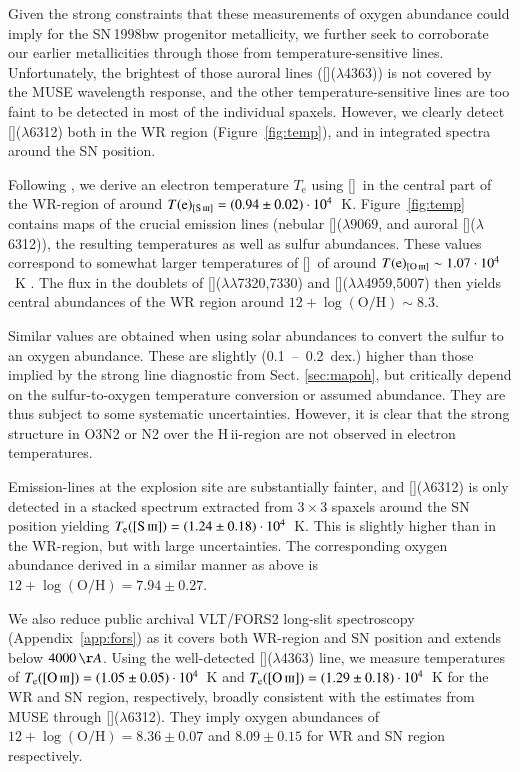 \documentclass[traditabstract]{aa}
\newcommand{\hii}{\mbox{H\,{\sc ii}}}
\newcommand{\oh}{12+\log(\mathrm{O/H})}
\newcommand{\siii}{[\ion{S}{iii}]}
\newcommand{\oii}{[\ion{O}{ii}]}
\newcommand{\oiii}{[\ion{O}{iii}]}
\begin{document}
Given the strong constraints that these measurements of oxygen abundance could imply for the SN\,1998bw progenitor metallicity, we further seek to corroborate our earlier metallicities through those from temperature-sensitive lines. Unfortunately, the brightest of those auroral lines (\oiii($\lambda$4363)) is not covered by the MUSE wavelength response, and the other temperature-sensitive lines are too faint to be detected in most of the individual spaxels. However, we clearly detect \siii($\lambda$6312) both in the WR region (Figure~\ref{fig:temp}), and in integrated spectra around the SN position.



Following \citet{2013ApJS..207...21N}, we derive an electron temperature $T_{\mathrm{e}}$ using \siii\, in the central part of the WR-region of around $T(\mathrm{e})_{\siii}=(0.94\pm0.02)\cdot10^{4}$~K. Figure~\ref{fig:temp} contains maps of the crucial emission lines (nebular \siii($\lambda9069$, and auroral \siii($\lambda$6312)), the resulting temperatures as well as sulfur abundances. These values correspond to somewhat larger temperatures of \oiii~of around $T(\mathrm{e})_{\oiii} \sim 1.07\cdot10^{4}$~K \citep{2006A&A...448..955I, 2012A&A...547A..29B}. The flux in the doublets of \oii($\lambda\lambda$7320,7330) and \oiii($\lambda\lambda$4959,5007) then yields central abundances of the WR region around $\oh \sim 8.3$.

Similar values are obtained when using solar abundances to convert the sulfur to an oxygen abundance. These are slightly (0.1~--~0.2~dex.) higher than those implied by the strong line diagnostic from Sect. \ref{sec:mapoh}, but critically depend on the sulfur-to-oxygen temperature conversion or assumed abundance. They are thus subject to some systematic uncertainties. However, it is clear that the strong structure in O3N2 or N2 over the \hii-region are not observed in electron temperatures.

Emission-lines at the explosion site are substantially fainter, and \siii($\lambda$6312) is only detected in a stacked spectrum extracted from $3\times3$ spaxels around the SN position yielding $T_{\mathrm{e}}(\siii)=(1.24\pm0.18)\cdot10^{4}$~K. This is slightly higher than in the WR-region, but with large uncertainties. The corresponding oxygen abundance derived in a similar manner as above is $\oh=7.94\pm0.27$.

We also reduce public archival VLT/FORS2 long-slit spectroscopy (Appendix~\ref{app:fors}) as it covers both WR-region and SN position and extends below $4000\,\AA$. Using the well-detected \oiii($\lambda$4363) line, we measure temperatures of $T_{\mathrm{e}}(\oiii)=(1.05\pm0.05)\cdot 10^{4}$~K and $T_{\mathrm{e}}(\oiii)=(1.29\pm0.18)\cdot10^{4}$~K for the WR and SN region, respectively, broadly consistent with the estimates from MUSE through \siii($\lambda$6312). They imply oxygen abundances of $\oh=8.36\pm0.07$ and $8.09\pm0.15$ for WR and SN region respectively.
\end{document}
